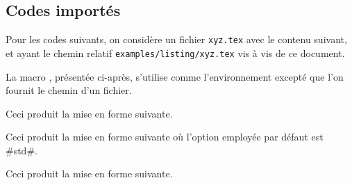 
\subsection{Codes importés}

Pour les codes suivants, on considère un fichier \verb+xyz.tex+ avec le contenu suivant, et ayant le chemin relatif \verb+examples/listing/xyz.tex+ vis à vis de ce document.


\medskip

La macro  , présentée ci-après, s'utilise comme l'environnement  excepté que l'on fournit le chemin d'un fichier.




\begin{bdocexa}
    \leavevmode

    \begin{bdoclatex}[code]
    \end{bdoclatex}

    Ceci produit la mise en forme suivante.

\end{bdocexa}




\begin{bdocexa}[À la suite]
    \leavevmode

    \begin{bdoclatex}[code]
    \end{bdoclatex}

    Ceci produit la mise en forme suivante où l'option employée par défaut est \bdocinlatex#std#.

\end{bdocexa}




\begin{bdocexa}
    \leavevmode

    \begin{bdoclatex}[code]
\bdoclatexinput[code]xyz.tex}
    \end{bdoclatex}

    Ceci produit la mise en forme suivante.

\end{bdocexa}


